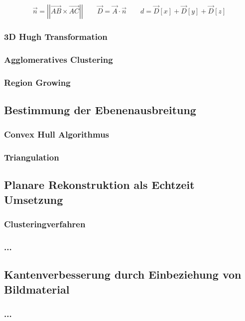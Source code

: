 \begin{equation}\label{eq:normalform}
\vec{n} =\left|\left| \vec{AB} \times \vec{AC}\right|\right|
\qquad
\vec{D} = \vec{A} \cdot \vec{n}
\qquad
d = \vec{D}\left[x\right] + \vec{D}\left[y\right] + \vec{D}\left[z\right]
\end{equation}


\subsubsection{3D Hugh Transformation}

\subsubsection{Agglomeratives Clustering}

\subsubsection{Region Growing}

\subsection{Bestimmung der Ebenenausbreitung}

\subsubsection{Convex Hull Algorithmus}

\subsubsection{Triangulation}

\subsection{Planare Rekonstruktion als Echtzeit Umsetzung}

\subsubsection{Clusteringverfahren}

\subsubsection{...}

\subsection{Kantenverbesserung durch Einbeziehung von Bildmaterial}

\subsubsection{...}